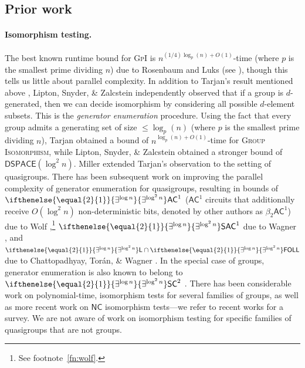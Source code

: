 \documentclass{article}
\newcommand{\algprobm}[1]{\textsc{#1}\xspace}
\newcommand{\betacc}[1]{\ifthenelse{\equal{#1}{1}}{\exists^{\log n}}{\exists^{\log^{#1}n}}} %
\newcommand*{\ComplexityClass}[1]{\ensuremath{\mathsf{#1}}\xspace}
\newcommand*{\LogSpace}{\ComplexityClass{L}}
\newcommand{\AC}{\ComplexityClass{AC}}
\newcommand{\SAC}{\ComplexityClass{SAC}}
\newcommand{\FOLL}{\ComplexityClass{FOLL}}
\begin{document}
\subsection{Prior work}
\paragraph{Isomorphism testing.} The best known runtime bound for \algprobm{GpI} is $n^{(1/4) \log_{p}(n) + O(1)}$-time (where $p$ is the smallest prime dividing $n$) due to Rosenbaum \cite{Rosenbaum2013BidirectionalCD} and Luks \cite{LuksCompositionSeriesIso} (see \cite[Sec. 2.2]{GR16}), though this tells us little about parallel complexity. In addition to Tarjan's result mentioned above \cite{MillerTarjan}, Lipton, Snyder, \& Zalcstein \cite{LiptonSnyderZalcstein} independently observed that if a group is $d$-generated, then we can decide isomorphism by considering all possible $d$-element subsets. This is the \textit{generator enumeration} procedure. Using the fact that  every group admits a generating set of size $\leq \log_{p}(n)$ (where $p$ is the smallest prime dividing $n$), Tarjan obtained a bound of $n^{\log_{p}(n) + O(1)}$-time for \algprobm{Group Isomorphism}, while Lipton, Snyder, \& Zalcstein \cite{LiptonSnyderZalcstein} obtained a stronger bound of $\mathsf{DSPACE}(\log^{2} n)$. Miller \cite{MillerTarjan} extended Tarjan's observation to the setting of quasigroups. There has been subsequent work on improving the parallel complexity of generator enumeration for quasigroups, resulting in bounds of $\betacc{2}\AC^{1}$ ($\AC^{1}$ circuits that additionally receive $O(\log^{2} n)$ non-deterministic bits, denoted by other authors as $\beta_{2}\AC^1$) due to Wolf
\cite{Wolf},\footnote{See footnote~\ref{fn:wolf}.} $\betacc{2}\SAC^{1}$ due to Wagner \cite{WagnerThesis}, and $\betacc{2}\LogSpace \cap \betacc{2}\FOLL$ due to Chattopadhyay, Tor\'an, \& Wagner \cite{ChattopadhyayToranWagner}. In the special case of groups, generator enumeration is also known to belong to $\betacc{2}\mathsf{SC}^{2}$ \cite{TangThesis}. There has been considerable work on polynomial-time, isomorphism tests for several families of groups, as well as more recent work on $\mathsf{NC}$ isomorphism tests---we refer to recent works \cite{GQcoho, DietrichWilson, GrochowLevetWL} for a survey. We are not aware of work on isomorphism testing for specific families of quasigroups that are not groups.
\end{document}
